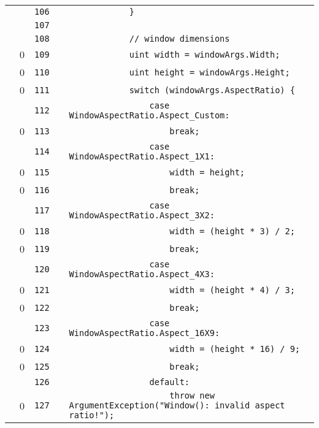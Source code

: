 \documentclass[a4paper,landscape,10pt]{article}
\begin{document}
\begin{longtable}[l]{lrrll}
\cellcolor{gray} &  & \verb~106~ & & \verb~            }~\\
\cellcolor{gray} &  & \verb~107~ & & \verb~~\\
\cellcolor{gray} &  & \verb~108~ & & \verb~            // window dimensions~\\
\cellcolor{red} & 0 & \verb~109~ & & \verb~            uint width = windowArgs.Width;~\\
\cellcolor{red} & 0 & \verb~110~ & & \verb~            uint height = windowArgs.Height;~\\
\cellcolor{red} & 0 & \verb~111~ & & \verb~            switch (windowArgs.AspectRatio) {~\\
\cellcolor{gray} &  & \verb~112~ & & \verb~                case WindowAspectRatio.Aspect_Custom:~\\
\cellcolor{red} & 0 & \verb~113~ & & \verb~                    break;~\\
\cellcolor{gray} &  & \verb~114~ & & \verb~                case WindowAspectRatio.Aspect_1X1:~\\
\cellcolor{red} & 0 & \verb~115~ & & \verb~                    width = height;~\\
\cellcolor{red} & 0 & \verb~116~ & & \verb~                    break;~\\
\cellcolor{gray} &  & \verb~117~ & & \verb~                case WindowAspectRatio.Aspect_3X2:~\\
\cellcolor{red} & 0 & \verb~118~ & & \verb~                    width = (height * 3) / 2;~\\
\cellcolor{red} & 0 & \verb~119~ & & \verb~                    break;~\\
\cellcolor{gray} &  & \verb~120~ & & \verb~                case WindowAspectRatio.Aspect_4X3:~\\
\cellcolor{red} & 0 & \verb~121~ & & \verb~                    width = (height * 4) / 3;~\\
\cellcolor{red} & 0 & \verb~122~ & & \verb~                    break;~\\
\cellcolor{gray} &  & \verb~123~ & & \verb~                case WindowAspectRatio.Aspect_16X9:~\\
\cellcolor{red} & 0 & \verb~124~ & & \verb~                    width = (height * 16) / 9;~\\
\cellcolor{red} & 0 & \verb~125~ & & \verb~                    break;~\\
\cellcolor{gray} &  & \verb~126~ & & \verb~                default:~\\
\cellcolor{red} & 0 & \verb~127~ & & \verb~                    throw new ArgumentException("Window(): invalid aspect ratio!");~\\

\end{longtable}
\end{document}
